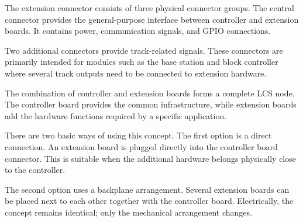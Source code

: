 The extension connector consists of three physical connector groups.
The central connector provides the general-purpose interface between controller and extension 
boards. It contains power, communication signals, and GPIO connections.

Two additional connectors provide track-related signals. These connectors are primarily intended for 
modules such as the base station and block controller where several track outputs need to be 
connected to extension hardware.


The combination of controller and extension boards forms a complete LCS node. The controller board 
provides the common infrastructure, while extension boards add the hardware functions required by a 
specific application.

There are two basic ways of using this concept.
The first option is a direct connection. An extension board is plugged directly into the controller 
board connector. This is suitable when the additional hardware belongs physically close to the 
controller.

The second option uses a backplane arrangement. Several extension boards can be placed next to each 
other together with the controller board. Electrically, the concept remains identical; only the 
mechanical arrangement changes.

